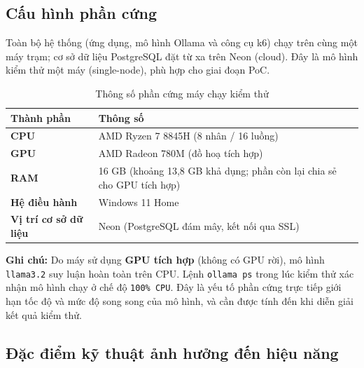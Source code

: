 \documentclass[12pt,a4paper]{article}
\begin{document}
\subsection{Cấu hình phần cứng}

Toàn bộ hệ thống (ứng dụng, mô hình Ollama và công cụ k6) chạy trên cùng một máy
trạm; cơ sở dữ liệu PostgreSQL đặt từ xa trên Neon (cloud). Đây là mô hình
kiểm thử một máy (single-node), phù hợp cho giai đoạn PoC.

\begin{table}[H]
\centering
\caption{Thông số phần cứng máy chạy kiểm thử}
\begin{tabularx}{\textwidth}{>{\bfseries}p{4.2cm}X}
\toprule
Thành phần & Thông số\\
\midrule
CPU & AMD Ryzen 7 8845H (8 nhân / 16 luồng)\\
GPU & AMD Radeon 780M (đồ hoạ tích hợp)\\
RAM & 16 GB (khoảng 13,8 GB khả dụng; phần còn lại chia sẻ cho GPU tích hợp)\\
Hệ điều hành & Windows 11 Home\\
Vị trí cơ sở dữ liệu & Neon (PostgreSQL đám mây, kết nối qua SSL)\\
\bottomrule
\end{tabularx}
\end{table}

\noindent\textbf{Ghi chú:} Do máy sử dụng \textbf{GPU tích hợp} (không có GPU rời),
mô hình \texttt{llama3.2} suy luận hoàn toàn trên CPU. Lệnh \texttt{ollama ps}
trong lúc kiểm thử xác nhận mô hình chạy ở chế độ \texttt{100\% CPU}. Đây là yếu
tố phần cứng trực tiếp giới hạn tốc độ và mức độ song song của mô hình, và cần
được tính đến khi diễn giải kết quả kiểm thử.

\subsection{Đặc điểm kỹ thuật ảnh hưởng đến hiệu năng}
\end{document}
